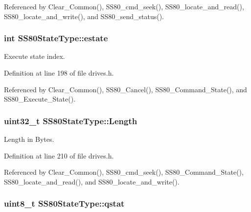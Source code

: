 Referenced by Clear\+\_\+\+Common(), S\+S80\+\_\+cmd\+\_\+seek(), S\+S80\+\_\+locate\+\_\+and\+\_\+read(), S\+S80\+\_\+locate\+\_\+and\+\_\+write(), and S\+S80\+\_\+send\+\_\+status().

\subsubsection[{\texorpdfstring{estate}{estate}}]{\setlength{\rightskip}{0pt plus 5cm}int S\+S80\+State\+Type\+::estate}\hypertarget{structSS80StateType_ae4a94143cb4201687be4e33684be057e}{}\label{structSS80StateType_ae4a94143cb4201687be4e33684be057e}


Execute state index. 



Definition at line 198 of file drives.\+h.



Referenced by Clear\+\_\+\+Common(), S\+S80\+\_\+\+Cancel(), S\+S80\+\_\+\+Command\+\_\+\+State(), and S\+S80\+\_\+\+Execute\+\_\+\+State().

\subsubsection[{\texorpdfstring{Length}{Length}}]{\setlength{\rightskip}{0pt plus 5cm}uint32\+\_\+t S\+S80\+State\+Type\+::\+Length}\hypertarget{structSS80StateType_a507159f0a0a4f3127488081fd618e8f6}{}\label{structSS80StateType_a507159f0a0a4f3127488081fd618e8f6}


Length in Bytes. 



Definition at line 210 of file drives.\+h.



Referenced by Clear\+\_\+\+Common(), S\+S80\+\_\+cmd\+\_\+seek(), S\+S80\+\_\+\+Command\+\_\+\+State(), S\+S80\+\_\+locate\+\_\+and\+\_\+read(), and S\+S80\+\_\+locate\+\_\+and\+\_\+write().

\subsubsection[{\texorpdfstring{qstat}{qstat}}]{\setlength{\rightskip}{0pt plus 5cm}uint8\+\_\+t S\+S80\+State\+Type\+::qstat}\hypertarget{structSS80StateType_ad4911c7b89ec1ff2c0aa01881b1e3d3a}{}\label{structSS80StateType_ad4911c7b89ec1ff2c0aa01881b1e3d3a}



